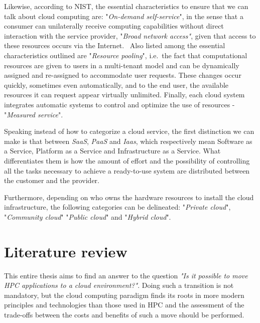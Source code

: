 Likewise, according to NIST, the essential characteristics to ensure that we can
talk about cloud computing are: "\textit{On-demand self-service}",
in the sense that a consumer can unilaterally receive computing capabilities
without direct interaction with the service provider, "\textit{Broad network
  access"}, given that access to these resources occurs via the Internet.
 Also listed among the essential characteristics outlined are "\textit{Resource
  pooling}",
i.e. the fact that computational resources are given to users in a multi-tenant
model and can be dynamically assigned and re-assigned to accommodate user
requests.
These changes occur quickly, sometimes even automatically, and to the end user,
the available resources it can request appear virtually unlimited.
Finally, each cloud system integrates automatic systems to control and optimize
the use of resources - "\textit{Measured service}".

Speaking instead of how to categorize a cloud service, the first distinction we
can make is that between \textit{SaaS}, \textit{PaaS} and \textit{Iaas}, which
respectively mean Software as a Service, Platform as a Service and
Infrastructure as a Service. What differentiates them is how the amount of
effort and the possibility of controlling all the tasks necessary to achieve a
ready-to-use system are distributed between the customer and the provider.

\noindent Furthermore, depending on who owns the hardware resources to install the cloud
infrastructure, the following categories can be delineated: "\textit{Private
  cloud}", "\textit{Community cloud}" "\textit{Public cloud}" and
"\textit{Hybrid cloud}".

\section{Literature review}\label{sec:intro-literature-review}


This entire thesis aims to find an answer to the question \textit{"Is
  it possible to move HPC applications to a cloud environment?"}.
Doing such a transition is not mandatory, but the cloud computing paradigm finds
its roots in more modern principles and technologies than those used in HPC and
the assessment of the trade-offs between the costs and benefits of such a move
should be performed.


